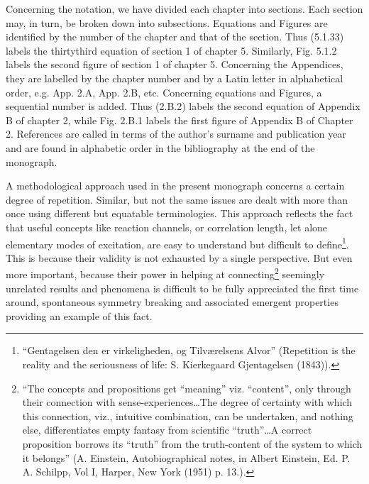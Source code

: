 Concerning the notation, we have divided each chapter into sections. Each section may, in turn, be broken down into subsections. Equations and Figures are identified by the number of the chapter and that of the section. Thus (5.1.33) labels the thirtythird equation of section 1 of chapter 5. Similarly, Fig. 5.1.2 labels the second figure of section 1 of chapter 5. Concerning the Appendices, they are labelled by the chapter number and by a Latin letter in alphabetical order, e.g. App. 2.A, App. 2.B, etc. Concerning equations and Figures, a sequential number is added. Thus (2.B.2) labels the second equation of Appendix B of chapter 2, while Fig. 2.B.1 labels the first figure of Appendix B of Chapter 2. References are called  in terms of the author's surname and publication year and are found in alphabetic order in the bibliography at the end of the monograph.

A methodological approach used in the present monograph concerns a certain degree of repetition. Similar, but not the same issues are dealt with more than once using different but equatable terminologies. This approach reflects the fact that useful concepts like reaction channels, or correlation length, let alone elementary modes of excitation, are easy to understand but difficult to define\footnote{\label{f10}``Gentagelsen den er virkeligheden, og Tilv\ae{}relsens Alvor'' (Repetition is the reality and the seriousness of life: S. Kierkegaard Gjentagelsen (1843)).}. This is because their validity is not exhausted by a single perspective. But even more important, because their power in helping at connecting\footnote{``The concepts and propositions get ``meaning'' viz. ``content'', only through their connection with sense-experiences\dots The degree of certainty with which this connection, viz., intuitive combination, can be undertaken, and nothing else, differentiates empty fantasy from scientific ``truth''\dots A correct proposition borrows its ``truth'' from the truth-content of the system to which it belongs'' (A. Einstein, Autobiographical notes, in Albert Einstein, Ed. P. A. Schilpp, Vol I, Harper, New York (1951) p. 13.).} seemingly unrelated results and phenomena is difficult to be fully appreciated the first time around, spontaneous symmetry breaking and associated emergent properties providing an example of this fact.

